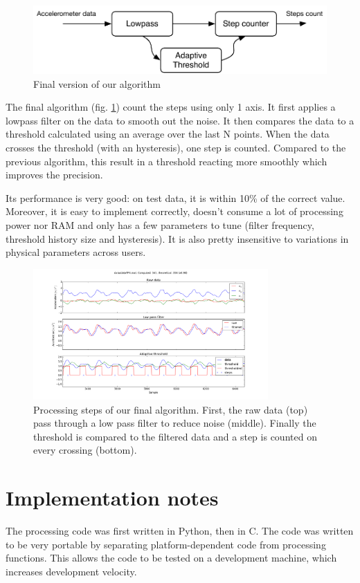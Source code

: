 \documentclass[12pt,twoside,a4paper]{article}
\begin{document}
\begin{figure}[h]
    \centering
    \includegraphics{algorithm}
    \caption{Final version of our algorithm}
    \label{fig:algorithm}
\end{figure}

The final algorithm (fig. \ref{fig:algorithm}) count the steps using only 1 axis.
It first applies a lowpass filter on the data to smooth out the noise.
It then compares the data to a threshold calculated using an average over the last N points.
When the data crosses the threshold (with an hysteresis), one step is counted.
Compared to the previous algorithm, this result in a threshold reacting more smoothly which improves the precision.

Its performance is very good: on test data, it is within 10\% of the correct value.
Moreover, it is easy to implement correctly, doesn't consume a lot of processing power nor RAM and only has a few parameters to tune (filter frequency, threshold history size and hysteresis).
It is also pretty insensitive to variations in physical parameters across users.

\begin{figure}[h]
    \centering
    \includegraphics[width=0.8\textwidth]{algorithm_steps}
    \caption{Processing steps of our final algorithm.
        First, the raw data (top) pass through a low pass filter to reduce noise (middle).
        Finally the threshold is compared to the filtered data and a step is counted on every crossing (bottom).
    }
    \label{fig:steps}
\end{figure}

\section{Implementation notes}
The processing code was first written in Python, then in C.
The code was written to be very portable by separating platform-dependent code from processing functions.
This allows the code to be tested on a development machine, which increases development velocity.
\end{document}
